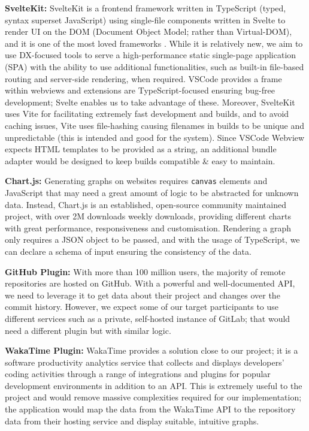 \documentclass{prrcs}
\newcommand{\cmmnt}[1]{}
\begin{document}
\textbf{SvelteKit:} SvelteKit is \cmmnt{a language \cmmnt{\cite{262588213843476TruthSvelte}} and }a frontend framework written in TypeScript (typed, syntax superset JavaScript)\cmmnt{\cite{harrisSvelteRethinkingReactivity2019}} using single-file components written in Svelte to render UI on the DOM (Document Object Model; rather than Virtual-DOM)\cmmnt{\cite{harrisVirtualDOMPure2018}}, and it is one of the most loved frameworks \cite{StateJS2021}. While it is relatively new, we aim to use DX-focused tools to serve a high-performance static single-page application (SPA) with the ability to use additional functionalities, such as built-in file-based routing and server-side rendering, when required. VSCode provides a frame within webviews and extensions are TypeScript-focused ensuring bug-free development; Svelte enables us to take advantage of these. Moreover, SvelteKit uses Vite for facilitating extremely fast development and builds, and to avoid caching issues, Vite uses file-hashing causing filenames in builds to be unique and unpredictable (this is intended and good for the system). Since VSCode Webview expects HTML templates to be provided as a string, an additional bundle adapter would be designed to keep builds compatible \& easy to maintain.

\textbf{Chart.js:} Generating graphs on websites requires \texttt{canvas} elements and JavaScript that may need a great amount of logic to be abstracted for unknown data. Instead, Chart.js is an established, open-source community maintained project, with over 2M downloads weekly downloads, providing different charts with great performance, responsiveness and customisation. Rendering a graph only requires a JSON object to be passed, and with the usage of TypeScript, we can declare a schema of input ensuring the consistency of the data.

\textbf{GitHub Plugin:} With more than 100 million users, the majority of remote repositories are hosted on GitHub. With a powerful and well-documented API, we need to leverage it to get data about their project and changes over the commit history. However, we expect some of our target participants to use different services such as a private, self-hosted instance of GitLab; that would need a different plugin but with similar logic.

\textbf{WakaTime Plugin:} WakaTime provides a solution close to our project; it is a software productivity analytics service that collects and displays developers' coding activities through a range of integrations and plugins for popular development environments in addition to an API. This is extremely useful to the project and would remove massive complexities required for our implementation; the application would map the data from the WakaTime API to the repository data from their hosting service and display suitable, intuitive graphs.
\end{document}
